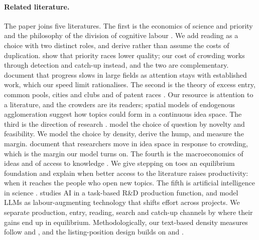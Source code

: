 \paragraph{Related literature.} The paper joins five literatures. The first is
the economics of science and priority
\citep{merton1957,merton1961,dasguptadavid1994,stephan1996,hillstein2025,hillstein2025race,bobtcheffetal2017}
and the philosophy of the division of cognitive labour
\citep{kitcher1990,strevens2003}. We add reading as a choice with two
distinct roles, and derive rather than assume the costs of duplication.
\citet{hillstein2025race} show that priority races lower quality; our cost of
crowding works through detection and catch-up instead, and the two are
complementary. \citet{chuevans2021} document that progress slows in large
fields as attention stays with established work, which our speed limit
rationalises. The second is the theory of excess entry, common pools, cities
and clubs
\citep{gordon1954,weitzman1974,mankiwwhinston1986,henderson1974,buchanan1965,hendersonbecker2000,scotchmer2002}
and of patent races \citep{loury1979,dasguptastiglitz1980}. Our resource is
attention to a literature, and the crowders are its readers; spatial models of
endogenous agglomeration \citep{lucasrossihansberg2002,allenarkolakis2014}
suggest how topics could form in a continuous idea space. The third is the
direction of research
\citep{bryanlemus2017,hopenhaynsquintani2021,carnehlschneider2025,bramoullesaintpaul2010,rzhetskyetal2015,fosteretal2015,myers2020,borjasdoran2012,borjasdoran2015,azoulayetal2019}.
\citet{carnehlschneider2025} model the choice of question by novelty and
feasibility. We model the choice by density, derive the hump, and measure the
margin. \citet{borjasdoran2015} document that researchers move in idea space in
response to crowding, which is the margin our model turns on. The fourth is the
macroeconomics of ideas and of access to knowledge
\citep{romer1990,aghionhowitt1992,jones1995,kortum1997,weitzman1998,bloometal2020,jones2009,ekerdtwu2024,furmanstern2011,murrayetal2016,iariaetal2018,biasimoser2021,evans2008,mccabesnyder2015,agrawaletal2016,parketal2023}.
We give stepping on toes an equilibrium foundation and explain when better
access to the literature raises productivity: when it reaches the people who
open new topics. The fifth is artificial intelligence in science
\citep{agrawaletal2019,brynjolfssonetal2019,jones2025ai,duedeetal2026,haoetal2026,liangetal2024,kusumegietal2025}.
\citet{jones2025ai} studies AI in a task-based R\&D production function, and
\citet{duedeetal2026} model LLMs as labour-augmenting technology that shifts
effort across projects. We separate production, entry, reading, search and
catch-up channels by where their gains end up in equilibrium.
Methodologically, our text-based density measures follow
\citet{hobergphillips2016} and \citet{kellyetal2021}, and the listing-position
design builds on \citet{haqueginsparg2009,haqueginsparg2010} and
\citet{feenbergetal2017}.

